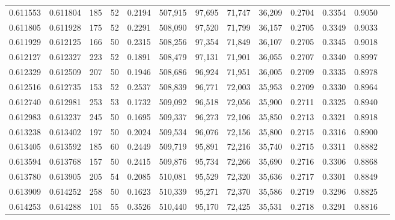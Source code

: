 \begin{tabular}{rrrrrrrrrrrrr}
0.611553 & 0.611804 &   185 &  52 &                                     0.2194 & 507,915 &  97,695 &  71,747 &  36,209 & 0.2704 & 0.3354 & 0.9050 \\
0.611805 & 0.611928 &   175 &  52 &                                     0.2291 & 508,090 &  97,520 &  71,799 &  36,157 & 0.2705 & 0.3349 & 0.9033 \\
0.611929 & 0.612125 &   166 &  50 &                                     0.2315 & 508,256 &  97,354 &  71,849 &  36,107 & 0.2705 & 0.3345 & 0.9018 \\
0.612127 & 0.612327 &   223 &  52 &                                     0.1891 & 508,479 &  97,131 &  71,901 &  36,055 & 0.2707 & 0.3340 & 0.8997 \\
0.612329 & 0.612509 &   207 &  50 &                                     0.1946 & 508,686 &  96,924 &  71,951 &  36,005 & 0.2709 & 0.3335 & 0.8978 \\
0.612516 & 0.612735 &   153 &  52 &                                     0.2537 & 508,839 &  96,771 &  72,003 &  35,953 & 0.2709 & 0.3330 & 0.8964 \\
0.612740 & 0.612981 &   253 &  53 &                                     0.1732 & 509,092 &  96,518 &  72,056 &  35,900 & 0.2711 & 0.3325 & 0.8940 \\
0.612983 & 0.613237 &   245 &  50 &                                     0.1695 & 509,337 &  96,273 &  72,106 &  35,850 & 0.2713 & 0.3321 & 0.8918 \\
0.613238 & 0.613402 &   197 &  50 &                                     0.2024 & 509,534 &  96,076 &  72,156 &  35,800 & 0.2715 & 0.3316 & 0.8900 \\
0.613405 & 0.613592 &   185 &  60 &                                     0.2449 & 509,719 &  95,891 &  72,216 &  35,740 & 0.2715 & 0.3311 & 0.8882 \\
0.613594 & 0.613768 &   157 &  50 &                                     0.2415 & 509,876 &  95,734 &  72,266 &  35,690 & 0.2716 & 0.3306 & 0.8868 \\
0.613780 & 0.613905 &   205 &  54 &                                     0.2085 & 510,081 &  95,529 &  72,320 &  35,636 & 0.2717 & 0.3301 & 0.8849 \\
0.613909 & 0.614252 &   258 &  50 &                                     0.1623 & 510,339 &  95,271 &  72,370 &  35,586 & 0.2719 & 0.3296 & 0.8825 \\
0.614253 & 0.614288 &   101 &  55 &                                     0.3526 & 510,440 &  95,170 &  72,425 &  35,531 & 0.2718 & 0.3291 & 0.8816 \\

\end{tabular}
